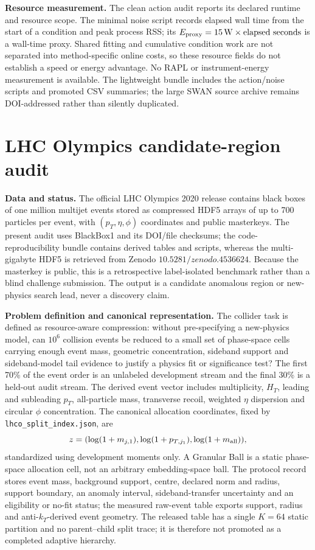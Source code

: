 \documentclass[11pt,a4paper]{article}
\numberwithin{equation}{section}
\theoremstyle{definition}\newtheorem{definition}[theorem]{Definition}
\theoremstyle{remark}\newtheorem{remark}[theorem]{Remark}
\begin{document}
\textbf{Resource measurement.} The clean action audit reports its declared runtime and resource scope. The minimal noise script records elapsed wall time from the start of a condition and peak process RSS; its $E_{\rm proxy}=15\,{\rm W}\times{\rm elapsed\ seconds}$ is a wall-time proxy. Shared fitting and cumulative condition work are not separated into method-specific online costs, so these resource fields do not establish a speed or energy advantage. No RAPL or instrument-energy measurement is available. The lightweight bundle includes the action/noise scripts and promoted CSV summaries; the large SWAN source archive remains DOI-addressed rather than silently duplicated.

\section{LHC Olympics candidate-region audit}\label{sec:lhco}
\sloppy
\textbf{Data and status.} The official LHC Olympics 2020 release contains black boxes of one million multijet events stored as compressed HDF5 arrays of up to 700 particles per event, with $(p_T,\eta,\phi)$ coordinates and public masterkeys. The present audit uses BlackBox1 and its DOI/file checksums; the code-reproducibility bundle contains derived tables and scripts, whereas the multi-gigabyte HDF5 is retrieved from Zenodo $10.5281/zenodo.4536624$. Because the masterkey is public, this is a retrospective label-isolated benchmark rather than a blind challenge submission. The output is a candidate anomalous region or new-physics search lead, never a discovery claim.

\textbf{Problem definition and canonical representation.} The collider task is defined as resource-aware compression: without pre-specifying a new-physics model, can $10^6$ collision events be reduced to a small set of phase-space cells carrying enough event mass, geometric concentration, sideband support and sideband-model tail evidence to justify a physics fit or significance test? The first 70\% of the event order is an unlabeled development stream and the final 30\% is a held-out audit stream. The derived event vector includes multiplicity, $H_T$, leading and subleading $p_T$, all-particle mass, transverse recoil, weighted $\eta$ dispersion and circular $\phi$ concentration. The canonical allocation coordinates, fixed by \texttt{lhco\_split\_index.json}, are
\[
z=(\log(1+m_{j,1}),\log(1+p_{T,j_1}),\log(1+m_{\rm all})),
\]
standardized using development moments only. A Granular Ball is a static phase-space allocation cell, not an arbitrary embedding-space ball. The protocol record stores event mass, background support, centre, declared norm and radius, support boundary, an anomaly interval, sideband-transfer uncertainty and an eligibility or no-fit status; the measured raw-event table exports support, radius and anti-$k_T$-derived event geometry. The released table has a single $K=64$ static partition and no parent--child split trace; it is therefore not promoted as a completed adaptive hierarchy.
\end{document}
